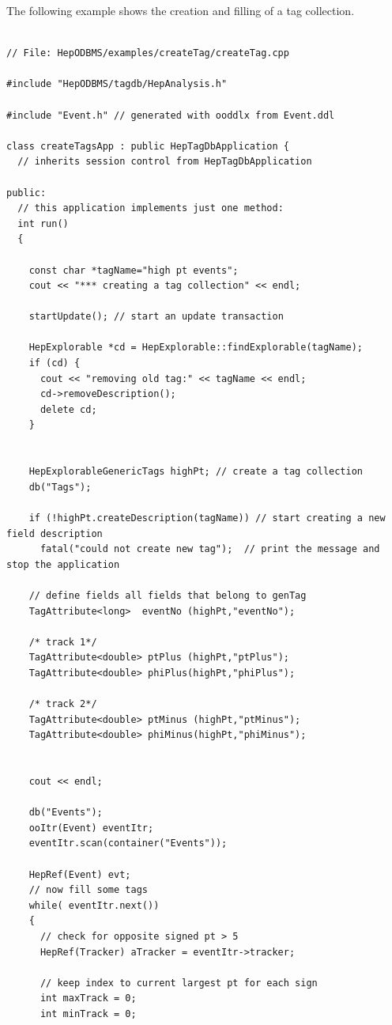 \par

The following example shows the creation and filling of a tag collection.
\begin{verbatim}

// File: HepODBMS/examples/createTag/createTag.cpp 

#include "HepODBMS/tagdb/HepAnalysis.h" 

#include "Event.h" // generated with ooddlx from Event.ddl 

class createTagsApp : public HepTagDbApplication { 
  // inherits session control from HepTagDbApplication 
  
public: 
  // this application implements just one method: 
  int run() 
  { 

    const char *tagName="high pt events"; 
    cout << "*** creating a tag collection" << endl; 

    startUpdate(); // start an update transaction 

    HepExplorable *cd = HepExplorable::findExplorable(tagName); 
    if (cd) { 
      cout << "removing old tag:" << tagName << endl; 
      cd->removeDescription(); 
      delete cd; 
    } 
  

    HepExplorableGenericTags highPt; // create a tag collection 
    db("Tags"); 

    if (!highPt.createDescription(tagName)) // start creating a new field description 
      fatal("could not create new tag");  // print the message and stop the application 

    // define fields all fields that belong to genTag 
    TagAttribute<long>  eventNo (highPt,"eventNo"); 
  
    /* track 1*/ 
    TagAttribute<double> ptPlus (highPt,"ptPlus"); 
    TagAttribute<double> phiPlus(highPt,"phiPlus"); 
  
    /* track 2*/ 
    TagAttribute<double> ptMinus (highPt,"ptMinus"); 
    TagAttribute<double> phiMinus(highPt,"phiMinus"); 
  

    cout << endl; 

    db("Events"); 
    ooItr(Event) eventItr; 
    eventItr.scan(container("Events")); 

    HepRef(Event) evt; 
    // now fill some tags 
    while( eventItr.next()) 
    { 
      // check for opposite signed pt > 5 
      HepRef(Tracker) aTracker = eventItr->tracker; 

      // keep index to current largest pt for each sign 
      int maxTrack = 0; 
      int minTrack = 0; 


\end{verbatim}

